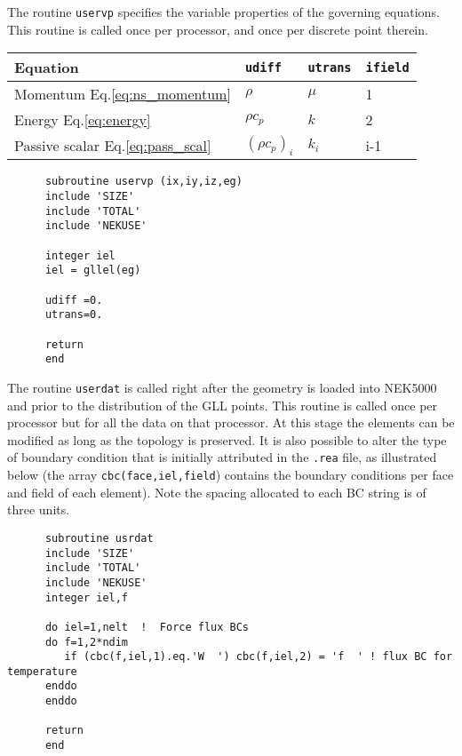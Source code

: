 The routine {\tt uservp} specifies the variable properties of the governing equations.
This routine is called once per processor, and once per discrete point therein. 
\\

\begin{tabular}{ l|l|l|l }
   \hline
   Equation & {\tt udiff} & {\tt utrans} & {\tt ifield} \\ \hline \hline
   Momentum Eq.\ref{eq:ns_momentum} & $\rho$ & $\mu$ & 1 \\ 
   Energy Eq.\ref{eq:energy} & $\rho c_p$ & $k$ & 2\\ 
   Passive scalar Eq.\ref{eq:pass_scal} &$(\rho c_p)_i$ & $k_i$& i-1\\
   \hline
\end{tabular}


\begin{lstlisting}
      subroutine uservp (ix,iy,iz,eg)
      include 'SIZE'
      include 'TOTAL'
      include 'NEKUSE'
      
      integer iel
      iel = gllel(eg)

      udiff =0.
      utrans=0.
      
      return
      end
\end{lstlisting}

The routine {\tt userdat} is called right after the geometry is loaded into NEK5000 and prior to the distribution of the GLL points. This routine is called once per processor but for all the data on that processor. At this stage the elements can be modified as long as the topology is preserved. It is also possible to alter the type of boundary condition that is initially attributed in the {\tt .rea} file, as illustrated below (the array {\tt cbc(face,iel,field}) contains the boundary conditions per face and field of each element). Note the spacing allocated to each BC string is of three units.

\begin{lstlisting}
      subroutine usrdat
      include 'SIZE'
      include 'TOTAL'
      include 'NEKUSE'
      integer iel,f

      do iel=1,nelt  !  Force flux BCs
      do f=1,2*ndim
         if (cbc(f,iel,1).eq.'W  ') cbc(f,iel,2) = 'f  ' ! flux BC for temperature
      enddo
      enddo
   
      return
      end
\end{lstlisting}

